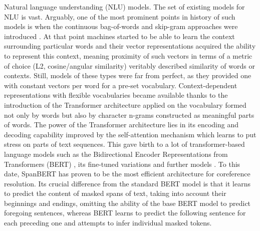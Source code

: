 Natural language understanding (NLU) models. 
The set of existing models for NLU is vast. 
Arguably, one of the most prominent points in history of such models is when the continuous bag-of-words and skip-gram approaches were introduced \cite{w2v-Mikolov2013}. 
At that point machines started to be able to learn the context surrounding particular words and their vector representations  acquired the ability to represent this context, meaning proximity of such vectors in terms of a metric of choice (L2, cosine/angular similarity) veritably described similarity of words or contexts. 
Still, models of these types were far from perfect, as they provided one with constant vectors per word for a pre-set vocabulary. 
Context-dependent representations with flexible vocabularies became available thanks to the introduction of the Transformer architecture \cite{transformer-Vaswani2017} applied on the vocabulary formed not only by words but also by character n-grams constructed as meaningful parts of words.  
The power of the Transformer architecture lies in its encoding and decoding capability improved by the self-attention mechanism which learns to put stress on parts of text sequences. 
This gave birth to a lot of transformer-based language models such as the Bidirectional Encoder Representations from Transformers (BERT) \cite{bert-Devlin2019}, its fine-tuned variations \cite{albert-Lan2020,robarta-Liu2019} and further models \cite{gpt-Radford2018,use-Cer2018}. 
To this date, SpanBERT \cite{cr-Joshi2019} has proven to be the most efficient architecture for coreference resolution. 
Its crucial difference from the standard BERT model is that it learns to predict the content of masked spans of text, taking into account their beginnings and endings, omitting the ability of the base BERT model to predict foregoing  sentences, whereas BERT learns to predict the following sentence for each preceding one and attempts to infer individual masked tokens. 


